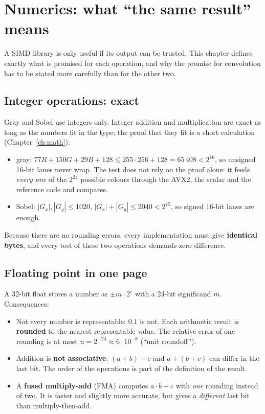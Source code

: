 \chapter{Numerics: what ``the same result'' means}\label{ch:numerics}

A SIMD library is only useful if its output can be trusted. This chapter defines exactly what is promised for each operation, and why the promise for convolution has to be stated more carefully than for the other two.

\section{Integer operations: exact}

Gray and Sobel use integers only. Integer addition and multiplication are exact as long as the numbers fit in the type; the proof that they fit is a short calculation (Chapter~\ref{ch:math}):
\begin{itemize}
\item gray: $77R+150G+29B+128\le255\cdot256+128=65\,408<2^{16}$, so unsigned 16-bit lanes never wrap. The test  does not rely on the proof alone: it feeds \emph{every one} of the $2^{24}$ possible colours through the AVX2, the scalar and the reference code and compares.
\item Sobel: $|G_x|,|G_y|\le1020$, $|G_x|+|G_y|\le2040<2^{15}$, so signed 16-bit lanes are enough.
\end{itemize}
Because there are no rounding errors, every implementation must give \textbf{identical bytes}, and every test of these two operations demands zero difference.

\section{Floating point in one page}

A 32-bit float stores a number as $\pm m\cdot2^{e}$ with a 24-bit significand $m$. Consequences:
\begin{itemize}
\item Not every number is representable: $0.1$ is not. Each arithmetic result is \textbf{rounded} to the nearest representable value. The relative error of one rounding is at most $u=2^{-24}\approx6\cdot10^{-8}$ (``unit roundoff'').
\item Addition is \textbf{not associative}: $(a+b)+c$ and $a+(b+c)$ can differ in the last bit. The order of the operations is part of the definition of the result.
\item A \textbf{fused multiply-add} (FMA) computes $a\cdot b+c$ with \emph{one} rounding instead of two. It is faster and slightly more accurate, but gives a \emph{different} last bit than multiply-then-add.
\end{itemize}

